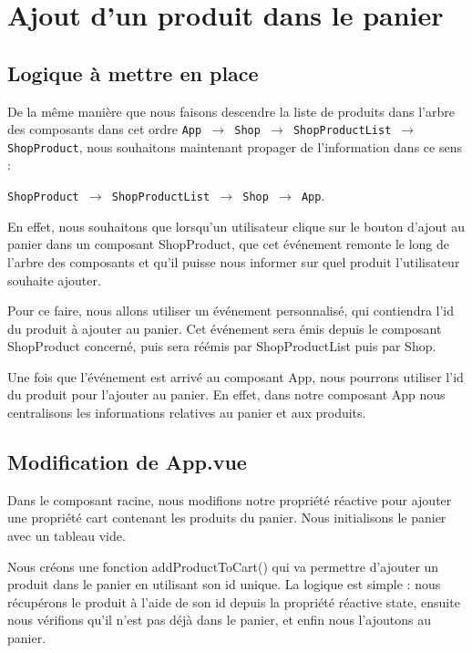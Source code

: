 
\section{Ajout d'un produit dans le panier}
\subsection{Logique à mettre en place}
De la même manière que nous faisons descendre la liste de produits dans l'arbre des composants dans cet ordre {\tt App $\to$ Shop $\to$ ShopProductList $\to$ ShopProduct}, nous souhaitons maintenant propager de l'information dans ce sens :
\begin{center}
{\tt  ShopProduct $\to$ ShopProductList $\to$ Shop $\to$ App}.
\end{center}

En effet, nous souhaitons que lorsqu'un utilisateur clique sur le bouton d'ajout au panier dans un composant {\color{monOrange}ShopProduct}, que cet événement remonte le long de l'arbre des composants et qu'il puisse nous informer sur quel produit l'utilisateur souhaite ajouter.

Pour ce faire, nous allons utiliser un événement personnalisé, qui contiendra l'{\color{monOrange}id} du produit à ajouter au panier. Cet événement sera émis depuis le composant {\color{monOrange}ShopProduct} concerné, puis sera réémis par {\color{monOrange}ShopProductList} puis par {\color{monOrange}Shop}.

Une fois que l'événement est arrivé au composant {\color{monOrange}App}, nous pourrons utiliser l'{\color{monOrange}id} du produit pour l'ajouter au panier. En effet, dans notre composant {\color{monOrange}App} nous centralisons les informations relatives au panier et aux produits.

\subsection{Modification de {\color{monOrange}App.vue}}
Dans le composant racine, nous modifions notre propriété réactive pour ajouter une propriété {\color{monOrange}cart} contenant les produits du panier. Nous initialisons le panier avec un tableau vide.

Nous créons une fonction {\color{monOrange}addProductToCart()} qui va permettre d'ajouter un produit dans le panier en utilisant son id unique. La logique est simple : nous récupérons le produit à l'aide de son id depuis la propriété réactive {\color{monOrange}state}, ensuite nous vérifions qu'il n'est pas déjà dans le panier, et enfin nous l'ajoutons au panier.

